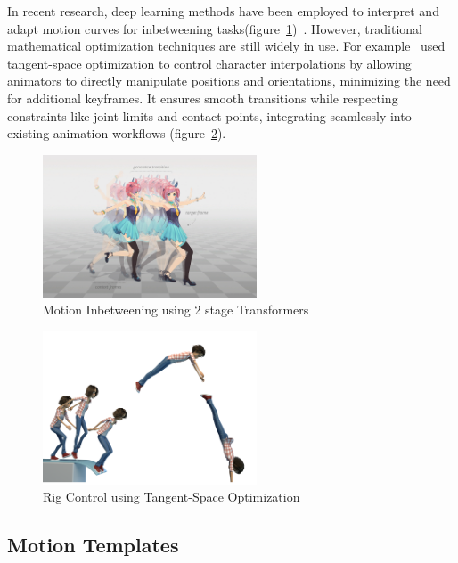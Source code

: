 \documentclass[../../main.tex]{subfiles}
\begin{document}
In recent research, deep learning methods have been employed to interpret and adapt motion curves for inbetweening tasks(figure~\ref{fig:inbetweening_transformers})~\cite{10.1145/3550454.3555454}. However, traditional mathematical optimization techniques are still widely in use. For example~\cite{10.1145/3306346.3322938} used tangent-space optimization to control character interpolations by allowing animators to directly manipulate positions and orientations, minimizing the need for additional keyframes. It ensures smooth transitions while respecting constraints like joint limits and contact points, integrating seamlessly into existing animation workflows (figure~\ref{fig:inbetweening_disney}). 

\begin{figure}
    \centering \includegraphics[width = 2.5in]{chapters/intermediate_blocks/images/inbetweening_transformers.jpg}
    \caption{Motion Inbetweening using 2 stage Transformers~\cite{10.1145/3306346.3322938}}
    \label{fig:inbetweening_transformers}
\end{figure}

\begin{figure}
    \centering \includegraphics[width = 2.5in]{chapters/intermediate_blocks/images/inbetweening_disney.png}
    \caption{Rig Control using Tangent-Space Optimization}
    \label{fig:inbetweening_disney}
\end{figure}

\subsection{Motion Templates}
\label{ch:intermediate_blocks:related_work:motion_templates}
\end{document}
